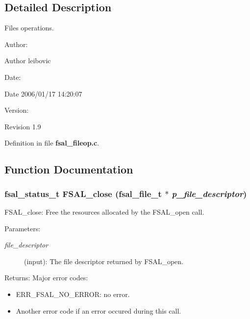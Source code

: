 \subsection{Detailed Description}
Files operations. 

\begin{Desc}
\item[Author:]\end{Desc}
\begin{Desc}
\item[Author]leibovic \end{Desc}
\begin{Desc}
\item[Date:]\end{Desc}
\begin{Desc}
\item[Date]2006/01/17 14:20:07 \end{Desc}
\begin{Desc}
\item[Version:]\end{Desc}
\begin{Desc}
\item[Revision]1.9 \end{Desc}


Definition in file {\bf fsal\_\-fileop.c}.

\subsection{Function Documentation}
\subsubsection[{FSAL\_\-close}]{\setlength{\rightskip}{0pt plus 5cm}fsal\_\-status\_\-t FSAL\_\-close (fsal\_\-file\_\-t $\ast$ {\em p\_\-file\_\-descriptor})}\label{fsal__fileop_8c_121c4bd9adece69ead065c015e967617}


FSAL\_\-close: Free the resources allocated by the FSAL\_\-open call.

\begin{Desc}
\item[Parameters:]
\begin{description}
\item[{\em file\_\-descriptor}](input): The file descriptor returned by FSAL\_\-open.\end{description}
\end{Desc}
\begin{Desc}
\item[Returns:]Major error codes:\begin{itemize}
\item ERR\_\-FSAL\_\-NO\_\-ERROR: no error.\item Another error code if an error occured during this call. \end{itemize}
\end{Desc}


